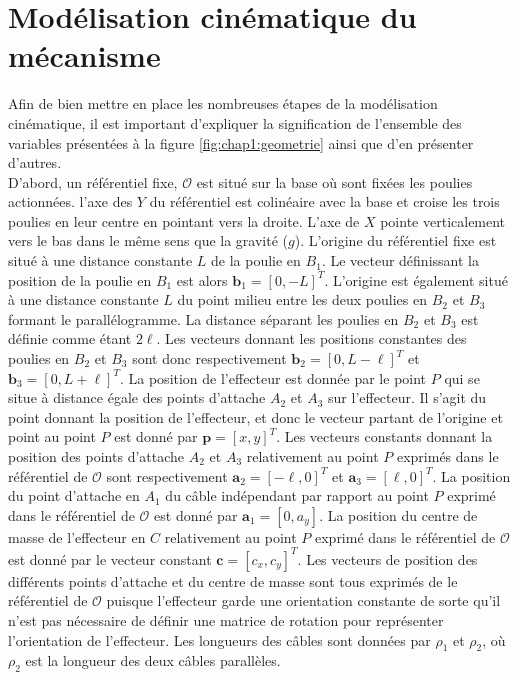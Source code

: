 \section{Modélisation cinématique du mécanisme}
Afin de bien mettre en place les nombreuses étapes de la modélisation cinématique, il est important d'expliquer la signification de l'ensemble des variables présentées à la figure \ref{fig:chap1:geometrie} ainsi que d'en présenter d'autres.\\
D'abord, un référentiel fixe, $\mathcal{O}$ est situé sur la base où sont fixées les poulies actionnées. l'axe des $Y$ du référentiel est colinéaire avec la base et croise les trois poulies en leur centre en pointant vers la droite. L'axe de $X$ pointe verticalement vers le bas dans le même sens que la gravité ($g$). L'origine du référentiel fixe est situé à une distance constante $L$ de la poulie en $B_1$. Le vecteur définissant la position de la poulie en $B_1$ est alors $\mathbf{b}_1=\left[0,-L\right]^T$. L'origine est également situé à une distance constante $L$ du point milieu entre les deux poulies en $B_2$ et $B_3$ formant le parallélogramme. La distance séparant les poulies en $B_2$ et $B_3$ est définie comme étant $2\ell$. Les vecteurs donnant les positions constantes des poulies en $B_2$ et $B_3$ sont donc respectivement $\mathbf{b}_2=\left[0,L-\ell\right]^T$ et $\mathbf{b}_3=\left[0,L+\ell\right]^T$. La position de l'effecteur est donnée par le point $P$ qui se situe à distance égale des points d'attache $A_2$ et $A_3$ sur l'effecteur. Il s'agit du point donnant la position de l'effecteur, et donc le vecteur partant de l'origine et point au point $P$ est donné par $\mathbf{p}=\left[x,y\right]^T$. Les vecteurs constants donnant la position des points d'attache $A_2$ et $A_3$ relativement au point $P$ exprimés dans le référentiel de $\mathcal{O}$ sont respectivement $\mathbf{a}_2 = [-\ell,0]^T$ et $\mathbf{a}_3 = [\ell,0]^T$. La position du point d'attache en $A_1$ du câble indépendant par rapport au point $P$ exprimé dans le référentiel de $\mathcal{O}$ est donné par $\mathbf{a}_1=\left[0,a_y\right]$. La position du centre de masse de l'effecteur en $C$ relativement au point $P$ exprimé dans le référentiel de $\mathcal{O}$ est donné par le vecteur constant $\mathbf{c}=\left[c_x,c_y\right]^T$. Les vecteurs de position des différents points d'attache et du centre de masse sont tous exprimés de le référentiel de $\mathcal{O}$ puisque l'effecteur garde une orientation constante de sorte qu'il n'est pas nécessaire de définir une matrice de rotation pour représenter l'orientation de l'effecteur. Les longueurs des câbles sont données par $\rho_1$ et $\rho_2$, où $\rho_2$ est la longueur des deux câbles parallèles.
